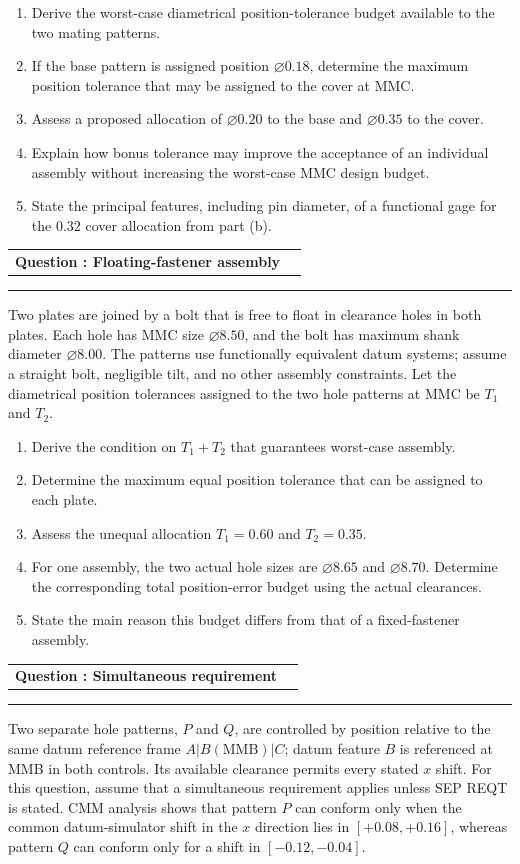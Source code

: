 \documentclass[11pt,a4paper]{article}
\makeatletter
\newcommand{\dia}{\ensuremath{\varnothing}}
\newcommand{\leveltag}[1]{%
  \fcolorbox{navy}{softgray}{\strut\small\bfseries\color{navy}#1}%
}
\newcommand{\qhead}[2]{%
  \clearpage
  \noindent\begin{tabularx}{\linewidth}{@{}Xr@{}}
  {\Large\bfseries\color{navy}Question \thequestion: #1} & \leveltag{#2}
  \end{tabularx}\par\vspace{-1mm}
  \noindent\rule{\linewidth}{0.6pt}\par\vspace{1mm}
}
\newcounter{question}
\newcommand{\question}[2]{\stepcounter{question}\qhead{#1}{#2}}
\makeatother
\begin{document}
\begin{enumerate}[label=(\alph*)]
\item Derive the worst-case diametrical position-tolerance budget available to the two mating patterns.
\item If the base pattern is assigned position \dia$0.18$, determine the maximum position tolerance that may be assigned to the cover at MMC.
\item Assess a proposed allocation of \dia$0.20$ to the base and \dia$0.35$ to the cover.
\item Explain how bonus tolerance may improve the acceptance of an individual assembly without increasing the worst-case MMC design budget.
\item State the principal features, including pin diameter, of a functional gage for the $0.32$ cover allocation from part (b).
\end{enumerate}

\question{Floating-fastener assembly}{Level II}

Two plates are joined by a bolt that is free to float in clearance holes in both plates. Each hole has MMC size \dia$8.50$, and the bolt has maximum shank diameter \dia$8.00$. The patterns use functionally equivalent datum systems; assume a straight bolt, negligible tilt, and no other assembly constraints. Let the diametrical position tolerances assigned to the two hole patterns at MMC be $T_1$ and $T_2$.

\begin{enumerate}[label=(\alph*)]
\item Derive the condition on $T_1+T_2$ that guarantees worst-case assembly.
\item Determine the maximum equal position tolerance that can be assigned to each plate.
\item Assess the unequal allocation $T_1=0.60$ and $T_2=0.35$.
\item For one assembly, the two actual hole sizes are \dia$8.65$ and \dia$8.70$. Determine the corresponding total position-error budget using the actual clearances.
\item State the main reason this budget differs from that of a fixed-fastener assembly.
\end{enumerate}

\question{Simultaneous requirement}{Level II}

Two separate hole patterns, $P$ and $Q$, are controlled by position relative to the same datum reference frame $A|B(\mathrm{MMB})|C$; datum feature $B$ is referenced at MMB in both controls. Its available clearance permits every stated $x$ shift. For this question, assume that a simultaneous requirement applies unless \textsc{SEP REQT} is stated. CMM analysis shows that pattern $P$ can conform only when the common datum-simulator shift in the $x$ direction lies in $[+0.08,+0.16]$, whereas pattern $Q$ can conform only for a shift in $[-0.12,-0.04]$.
\end{document}
